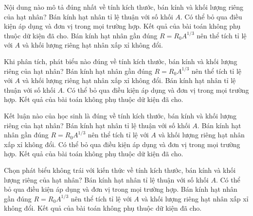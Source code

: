 \begin{ex}
Nội dung nào mô tả đúng nhất về tính kích thước, bán kính và khối lượng riêng của hạt nhân?
\choice
{Bán kính hạt nhân tỉ lệ thuận với số khối $A$.}
{Có thể bỏ qua điều kiện áp dụng và đơn vị trong mọi trường hợp.}
{Kết quả của bài toán không phụ thuộc dữ kiện đã cho.}
{\True Bán kính hạt nhân gần đúng $R=R_0A^{1/3}$ nên thể tích tỉ lệ với $A$ và khối lượng riêng hạt nhân xấp xỉ không đổi.}
\end{ex}

\begin{ex}
Khi phân tích, phát biểu nào đúng về tính kích thước, bán kính và khối lượng riêng của hạt nhân?
\choice
{\True Bán kính hạt nhân gần đúng $R=R_0A^{1/3}$ nên thể tích tỉ lệ với $A$ và khối lượng riêng hạt nhân xấp xỉ không đổi.}
{Bán kính hạt nhân tỉ lệ thuận với số khối $A$.}
{Có thể bỏ qua điều kiện áp dụng và đơn vị trong mọi trường hợp.}
{Kết quả của bài toán không phụ thuộc dữ kiện đã cho.}
\end{ex}

\begin{ex}
Kết luận nào của học sinh là đúng về tính kích thước, bán kính và khối lượng riêng của hạt nhân?
\choice
{Bán kính hạt nhân tỉ lệ thuận với số khối $A$.}
{\True Bán kính hạt nhân gần đúng $R=R_0A^{1/3}$ nên thể tích tỉ lệ với $A$ và khối lượng riêng hạt nhân xấp xỉ không đổi.}
{Có thể bỏ qua điều kiện áp dụng và đơn vị trong mọi trường hợp.}
{Kết quả của bài toán không phụ thuộc dữ kiện đã cho.}
\end{ex}

\begin{ex}
Chọn phát biểu không trái với kiến thức về tính kích thước, bán kính và khối lượng riêng của hạt nhân?
\choice
{Bán kính hạt nhân tỉ lệ thuận với số khối $A$.}
{Có thể bỏ qua điều kiện áp dụng và đơn vị trong mọi trường hợp.}
{\True Bán kính hạt nhân gần đúng $R=R_0A^{1/3}$ nên thể tích tỉ lệ với $A$ và khối lượng riêng hạt nhân xấp xỉ không đổi.}
{Kết quả của bài toán không phụ thuộc dữ kiện đã cho.}
\end{ex}

